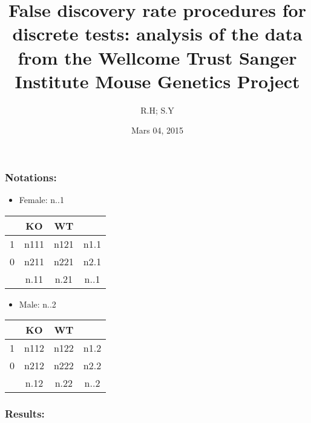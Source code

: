 \documentclass[]{article}
\title{False discovery rate procedures for discrete tests: analysis of the data
from the Wellcome Trust Sanger Institute Mouse Genetics Project}
\author{R.H; S.Y}
\date{Mars 04, 2015}
\begin{document}
\maketitle


\subsubsection{Notations:}\label{notations}

\begin{itemize}
\itemsep1pt\parskip0pt
\item
  Female: n..1
\end{itemize}

\begin{longtable}[c]{@{}lccc@{}}
\toprule
& KO & WT &\tabularnewline
\midrule
\endhead
1 & n111 & n121 & n1.1\tabularnewline
0 & n211 & n221 & n2.1\tabularnewline
& n.11 & n.21 & n..1\tabularnewline
\bottomrule
\end{longtable}

\begin{itemize}
\itemsep1pt\parskip0pt
\item
  Male: n..2
\end{itemize}

\begin{longtable}[c]{@{}lccc@{}}
\toprule
& KO & WT &\tabularnewline
\midrule
\endhead
1 & n112 & n122 & n1.2\tabularnewline
0 & n212 & n222 & n2.2\tabularnewline
& n.12 & n.22 & n..2\tabularnewline
\bottomrule
\end{longtable}

\subsubsection{Results:}\label{results}
\end{document}
